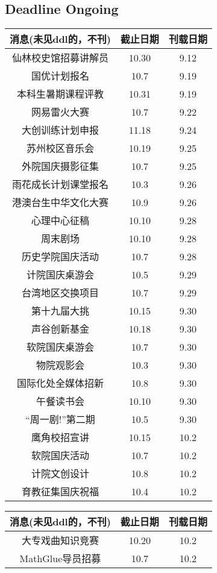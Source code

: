 \documentclass[letterpaper, 12pt]{article}
\begin{document}
\begin{multicols}{2}

\section{Deadline Ongoing}
\begin{tabular}{|c|c|c|}
    \hline
    消息(未见ddl的，不刊) & 截止日期 & 刊载日期\\
    \hline\hline
    仙林校史馆招募讲解员 & 10.30 & 9.12\\
    国优计划报名 & 10.7 & 9.19\\
    本科生暑期课程评教 & 10.31 & 9.19\\
    网易雷火大赛 & 10.7 & 9.22\\
    大创训练计划申报 & 11.18 & 9.24\\
    苏州校区音乐会 & 10.19 & 9.25\\
    外院国庆摄影征集 & 10.7 & 9.25\\
    雨花成长计划课堂报名 & 10.3 & 9.26\\
    港澳台生中华文化大赛 & 10.9 & 9.26\\
    心理中心征稿 & 10.10 & 9.28\\
    周末剧场 & 10.10 & 9.28\\
    历史学院国庆活动 & 10.7 & 9.28\\
    计院国庆桌游会 & 10.5 & 9.29\\
    台湾地区交换项目 & 10.7 & 9.29\\
    第十九届大挑 & 10.15 & 9.30\\
    声谷创新基金 & 10.18 & 9.30\\
    软院国庆桌游会 & 10.7 & 9.30\\
    物院观影会 & 10.3 & 9.30\\
    国际化处全媒体招新 & 10.8 & 9.30\\
    午餐读书会 & 10.10 & 9.30\\
    “周一剧!”第二期 & 10.5 & 9.30\\
    鹰角校招宣讲 & 10.15 & 10.2\\
    软院国庆活动 & 10.7 & 10.2\\
    计院文创设计 & 10.8 & 10.2\\
    育教征集国庆祝福 & 10.4 & 10.2\\

    \hline
\end{tabular}
\begin{tabular}{|c|c|c|}
    \hline
    消息(未见ddl的，不刊) & 截止日期 & 刊载日期\\
    \hline\hline
    大专戏曲知识竞赛 & 10.20 & 10.2\\
    MathGlue导员招募 & 10.7 & 10.2\\
    \hline
    \end{tabular}

\end{multicols}
\end{document}
